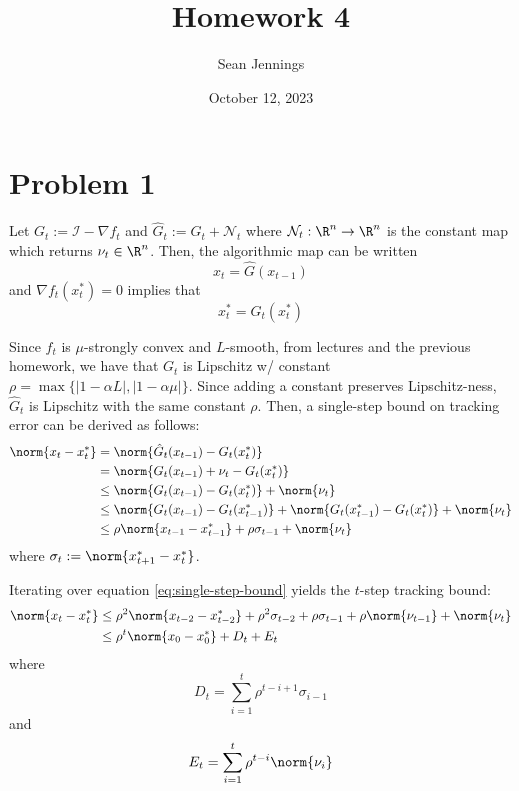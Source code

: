 \documentclass{homework}
\title{Homework 4}
\author{Sean Jennings}
\date{October 12, 2023}
\begin{document}
\maketitle

\section{Problem 1}

\renewcommand{\N}{\mathcal{N}}
\begin{letterenum}
\item Let $G_t := \mathcal{I} - \nabla f_t$ and $\hat{G}_t := G_t + \N_t$
where $\N_t: \R^n \to \R^n$ is the constant map which returns $\nu_t\in\R^n$.
Then, the algorithmic map can be written
\begin{equation*}
    x_t = \hat{G}(x_{t-1})
\end{equation*}
and $\nabla f_t(x_t^*) = 0$ implies that
\begin{equation*}
    x_t^* = G_t(x_t^*)
\end{equation*}

Since $f_t$ is $\mu$-strongly convex and $L$-smooth, from lectures and the previous
homework, we have that $G_t$ is Lipschitz w/ constant
$\rho = \max\{|1 - \alpha L|, |1 - \alpha \mu|\}$. Since adding a constant preserves
Lipschitz-ness, $\hat{G}_t$ is Lipschitz with the same constant $\rho$.
Then, a single-step bound on tracking error can be derived as follows:
\begin{align}
    \norm{x_t - x_t^*} &= \norm{\hat{G}_t(x_{t-1}) - G_t(x_t^*)} \\
        &= \norm{G_t(x_{t-1}) + \nu_t - G_t(x_t^*)} \\
        &\leq \norm{G_t(x_{t-1}) - G_t(x_t^*)} + \norm{\nu_t} \\
        &\leq \norm{G_t(x_{t-1}) - G_t(x_{t-1}^*)}
            + \norm{G_t(x_{t-1}^*) - G_t(x_t^*)} + \norm{\nu_t} \\
        &\leq \rho \norm{x_{t-1} - x_{t-1}^*} + \rho \sigma_{t-1} + \norm{\nu_t}
        \label{eq:single-step-bound}
\end{align}
where $\sigma_t := \norm{x_{t+1}^* - x_t^*}$.


Iterating over equation \ref{eq:single-step-bound} yields the $t$-step tracking
bound:
\begin{align}
    \norm{x_t - x_t^*} &\leq \rho^2 \norm{x_{t-2} - x_{t-2}^*} + \rho^2 \sigma_{t-2} +
        \rho \sigma_{t-1} + \rho \norm{\nu_{t-1}} + \norm{\nu_t} \\
        &\leq \rho^t \norm{x_0 - x_0^*} + D_t + E_t
        \label{eq:multi-step-bound}
\end{align}
where
\begin{equation*}
    D_t = \sum_{i=1}^t \rho^{t - i + 1} \sigma_{i-1}
\end{equation*}
and 
\begin{equation*}
    E_t = \sum_{i=1}^{t} \rho^{t-i} \norm{\nu_i}
\end{equation*}


\end{letterenum}
\end{document}
